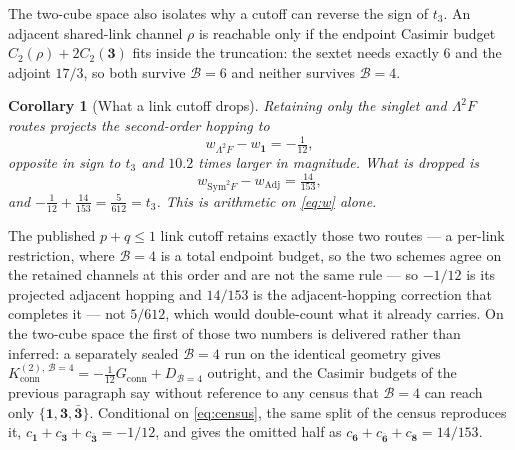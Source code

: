 \documentclass[11pt]{article}
\theoremstyle{plain}
\newtheorem{corollary}[theorem]{Corollary}
\theoremstyle{definition}
\theoremstyle{remark}
\newcommand{\chk}[1]{}
\begin{document}
The two-cube space also isolates why a cutoff can reverse the sign of $t_3$.
An adjacent shared-link channel $\rho$ is reachable only if the endpoint
Casimir budget $C_2(\rho)+2C_2(\mathbf 3)$ fits inside the truncation: the
sextet needs exactly $6$ and the adjoint $17/3$, so both survive
$\mathcal B=6$ and neither survives $\mathcal B=4$.
\chk{B=6 retains every adjacent shared-link channel; B=4 provably cannot}

\begin{corollary}[What a link cutoff drops]\label{cor:cutoff}
Retaining only the singlet and $\Lambda^2F$ routes projects the second-order
hopping to
\[
  w_{\Lambda^2F}-w_{\mathbf 1}=-\tfrac1{12},
\]
opposite in sign to $t_3$ and $10.2$ times larger in magnitude. What is
dropped is
\[
  w_{\mathrm{Sym}^2F}-w_{\mathrm{Adj}}=\tfrac{14}{153},
\]
and $-\tfrac1{12}+\tfrac{14}{153}=\tfrac5{612}=t_3$. This is arithmetic on
\eqref{eq:w} alone.
\end{corollary}

\noindent The published $p+q\le1$ link cutoff retains exactly those two
routes --- a per-link restriction, where $\mathcal B=4$ is a total endpoint
budget, so the two schemes agree on the retained channels at this order and are
not the same rule --- so $-1/12$ is its projected adjacent hopping and
$14/153$ is the adjacent-hopping correction that completes it --- not
$5/612$, which would double-count what it already carries. On the two-cube
space the first of those two numbers is delivered rather than inferred: a
separately sealed $\mathcal B=4$ run on the identical geometry gives
$K^{(2),\,\mathcal B=4}_{\mathrm{conn}}=-\tfrac1{12}G_{\mathrm{conn}}+D_{\mathcal B=4}$
outright, and the Casimir budgets of the previous paragraph say without
reference to any census that $\mathcal B=4$ can reach only
$\{\mathbf1,\mathbf3,\bar{\mathbf3}\}$. Conditional on \eqref{eq:census}, the
same split of the census reproduces it,
$c_{\mathbf 1}+c_{\mathbf 3}+c_{\bar{\mathbf 3}}=-1/12$, and gives the omitted
half as $c_{\mathbf 6}+c_{\bar{\mathbf 6}}+c_{\mathbf 8}=14/153$.
\chk{the B=6 six-channel census IS the Weingarten four-channel ledger, channel by channel}
\chk{FINDING: the T1 link cutoff reverses the sign of t\_3, and 14/153 is what it omits}
\end{document}
